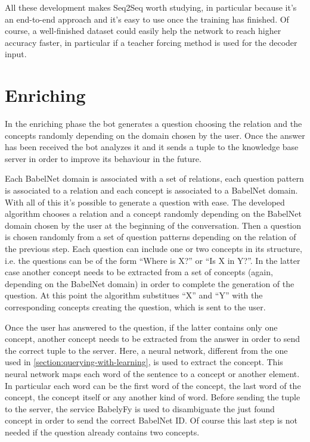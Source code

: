 \documentclass[paper=a4, fontsize=11pt]{scrartcl} %
\numberwithin{equation}{section} %
\numberwithin{figure}{section} %
\numberwithin{table}{section} %
\theoremstyle{definition}
\begin{document}
All these development makes Seq2Seq worth studying, in particular because it's
an end-to-end approach and it's easy to use once the training has finished.
Of course, a well-finished dataset could easily help the network to reach
higher accuracy faster, in particular if a teacher forcing method is used
for the decoder input.


\section{Enriching}
\label{section:enriching}

In the enriching phase the bot generates a question choosing the relation and
the concepts randomly depending on the domain chosen by the user. Once the
answer has been received the bot analyzes it and it sends a tuple to the knowledge
base server in order to improve its behaviour in the future.

Each BabelNet domain is associated with a set of relations, each question pattern
is associated to a relation and each concept is associated to a BabelNet domain.
With all of this it's possible to generate a question with ease. The developed
algorithm chooses a relation and a concept randomly depending on the BabelNet
domain chosen by the user at the beginning of the conversation. Then a question
is chosen randomly from a set of question patterns depending on the relation
of the previous step. Each question can include one or two concepts in its
structure, i.e. the questions can be of the form ``Where is X?'' or ``Is X in Y?''.
In the latter case another concept needs to be extracted from a set of concepts (again,
depending on the BabelNet domain) in order to complete the generation of the
question.
At this point the algorithm substitues ``X'' and ``Y'' with the corresponding
concepts creating the question, which is sent to the user.

Once the user has answered to the question, if the latter contains only one
concept, another concept needs to be extracted from the answer in order to send the
correct tuple to the server. Here, a neural network, different from the one
used in \ref{section:querying-with-learning}, is used to extract the concept.
This neural network maps each word of the sentence to a concept or another
element. In particular each word can be the first word of the concept, the last
word of the concept, the concept itself or any another kind of word. Before sending the
tuple to the server, the service BabelyFy is
used to disambiguate the just found concept in order to send the correct BabelNet ID.
Of course this last step is not needed if the question already contains two
concepts.
\end{document}
